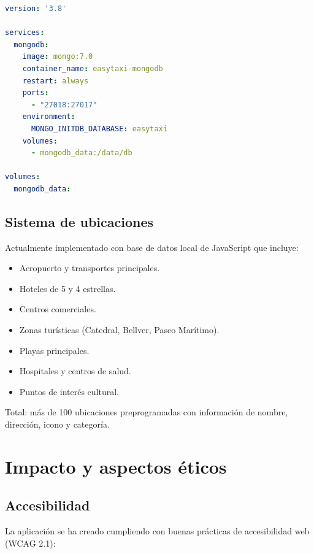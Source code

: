 \documentclass[12pt,a4paper]{article}
\begin{document}
\begin{lstlisting}[language=yaml, caption=docker-compose.yml]
version: '3.8'

services:
  mongodb:
    image: mongo:7.0
    container_name: easytaxi-mongodb
    restart: always
    ports:
      - "27018:27017"
    environment:
      MONGO_INITDB_DATABASE: easytaxi
    volumes:
      - mongodb_data:/data/db

volumes:
  mongodb_data:
\end{lstlisting}

\subsection{Sistema de ubicaciones}

Actualmente implementado con base de datos local de JavaScript que incluye:

\begin{itemize}
    \item Aeropuerto y transportes principales.
    \item Hoteles de 5 y 4 estrellas.
    \item Centros comerciales.
    \item Zonas turísticas (Catedral, Bellver, Paseo Marítimo).
    \item Playas principales.
    \item Hospitales y centros de salud.
    \item Puntos de interés cultural.
\end{itemize}

Total: más de 100 ubicaciones preprogramadas con información de nombre, dirección, icono y categoría.

\newpage

\section{Impacto y aspectos éticos}

\subsection{Accesibilidad}

La aplicación se ha creado cumpliendo con buenas prácticas de accesibilidad web (WCAG 2.1):
\end{document}
